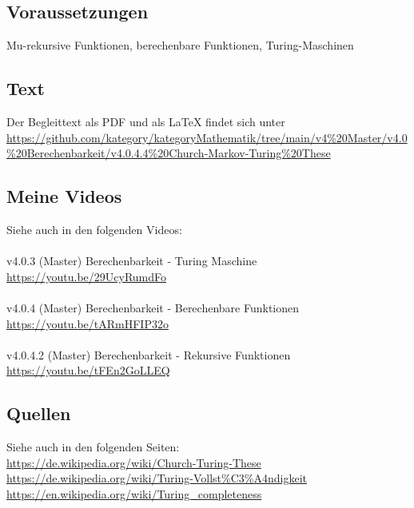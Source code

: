 \documentclass[a4paper]{amsart}
\theoremstyle{definition}
\begin{document}
\subsection*{Voraussetzungen}
Mu-rekursive Funktionen, berechenbare Funktionen, Turing-Maschinen

\subsection*{Text}
Der Begleittext als PDF und als LaTeX findet sich unter
{\tiny
   \url{https://github.com/kategory/kategoryMathematik/tree/main/v4%20Master/v4.0%20Berechenbarkeit/v4.0.4.4%20Church-Markov-Turing%20These}
}

\subsection*{Meine Videos}
Siehe auch in den folgenden Videos:\\
\\
v4.0.3 (Master) Berechenbarkeit - Turing Maschine\\
\url{https://youtu.be/29UcyRumdFo}\\
\\
v4.0.4 (Master) Berechenbarkeit - Berechenbare Funktionen\\
\url{https://youtu.be/tARmHFIP32o}\\
\\
v4.0.4.2 (Master) Berechenbarkeit - Rekursive Funktionen\\
\url{https://youtu.be/tFEn2GoLLEQ}

\subsection*{Quellen}
Siehe auch in den folgenden Seiten:\\
\url{https://de.wikipedia.org/wiki/Church-Turing-These}\\
\url{https://de.wikipedia.org/wiki/Turing-Vollst%C3%A4ndigkeit}\\
\url{https://en.wikipedia.org/wiki/Turing_completeness}
\end{document}
